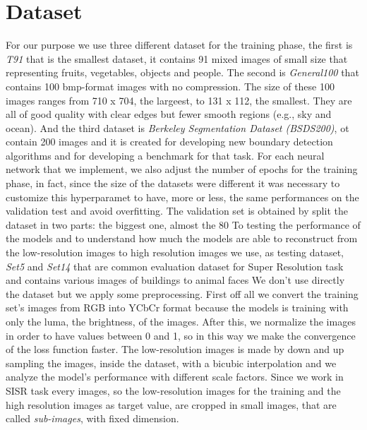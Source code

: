 \documentclass[10pt,twocolumn,letterpaper]{article}
\begin{document}
\section{Dataset}
For our purpose we use three different dataset for the training phase, the first is \textit{T91} that is the smallest dataset, it contains 91 mixed images of small size that representing fruits, vegetables, objects and people. The second is \textit{General100} that contains 100 bmp-format images with no compression. The size of these 100 images ranges from 710 x 704, the largeest, to 131 x 112, the smallest. They are all of good quality with clear edges but fewer smooth regions (e.g., sky and ocean). And the third dataset is \textit{Berkeley Segmentation Dataset (BSDS200)}, ot contain 200 images and it is created for developing new boundary detection algorithms and for developing a benchmark for that task. For each neural network that we implement, we also adjust the number of epochs for the training phase, in fact, since the size of the datasets were different it was necessary to customize this hyperparamet to have, more or less, the same performances on the validation test and avoid overfitting. The validation set is obtained by split the dataset in two parts: the biggest one, almost the 80%
To testing the performance of the models and to understand how much the models are able to reconstruct from the low-resolution images to high resolution images we use, as testing dataset, \textit{Set5} and \textit{Set14} that are common evaluation dataset  for Super Resolution task and contains various images of buildings to animal faces
We don’t use directly the dataset but we apply some preprocessing. First off all we convert the training set’s images from RGB into YCbCr format because the models is training with only the luma, the brightness, of the images. After this, we normalize the images in order to have values between 0 and 1, so in this way we make the convergence of the loss function faster. The low-resolution images is made by down and up sampling the images, inside the dataset, with a bicubic interpolation and we analyze the model’s performance with different scale factors. Since we work in SISR task every images, so the low-resolution images for the training and the high resolution images as target value, are cropped in small images, that are called \textit{sub-images}, with fixed dimension.
\end{document}
